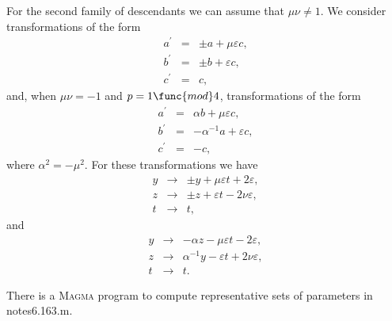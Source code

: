 \documentclass[12pt]{article}
\begin{document}
For the second family of descendants we can assume that $\mu \nu \neq 1$. We
consider transformations of the form%
\begin{eqnarray*}
a^{\prime } &=&\pm a+\mu \varepsilon c, \\
b^{\prime } &=&\pm b+\varepsilon c, \\
c^{\prime } &=&c,
\end{eqnarray*}%
and, when $\mu \nu =-1$ and $p=1\func{mod}4$, transformations of the form%
\begin{eqnarray*}
a^{\prime } &=&\alpha b+\mu \varepsilon c, \\
b^{\prime } &=&-\alpha ^{-1}a+\varepsilon c, \\
c^{\prime } &=&-c,
\end{eqnarray*}%
where $\alpha ^{2}=-\mu ^{2}$. For these transformations we have%
\begin{eqnarray*}
y &\rightarrow &\pm y+\mu \varepsilon t+2\varepsilon , \\
z &\rightarrow &\pm z+\varepsilon t-2\nu \varepsilon , \\
t &\rightarrow &t,
\end{eqnarray*}%
and%
\begin{eqnarray*}
y &\rightarrow &-\alpha z-\mu \varepsilon t-2\varepsilon , \\
z &\rightarrow &\alpha ^{-1}y-\varepsilon t+2\nu \varepsilon , \\
t &\rightarrow &t.
\end{eqnarray*}

There is a \textsc{Magma} program to compute representative sets of
parameters in notes6.163.m.
\end{document}
